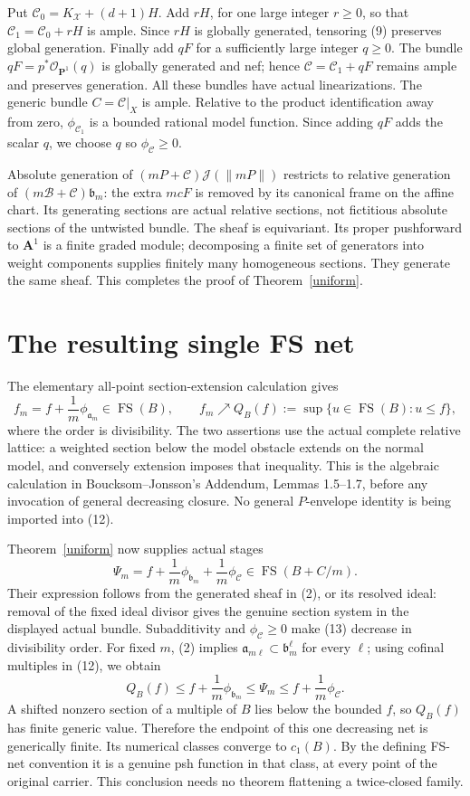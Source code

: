 \documentclass[10pt]{article}
\newcommand{\FS}{\operatorname{FS}}
\newcommand{\J}{\mathcal J}
\newcommand{\OO}{\mathcal O}
\begin{document}
Put $\mathcal C_0=K_{\mathcal X}+(d+1)H$. Add $rH$, for one large
integer $r\geq0$, so that $\mathcal C_1=\mathcal C_0+rH$ is ample.
Since $rH$ is globally generated, tensoring (9) preserves global
generation. Finally add $qF$ for a sufficiently large integer $q\geq0$.
The bundle $qF=p^*\OO_{\mathbf P^1}(q)$ is globally generated and
nef; hence $\mathcal C=\mathcal C_1+qF$ remains ample and preserves
generation. All these bundles have actual linearizations. The generic
bundle $C=\mathcal C|_X$ is ample. Relative to the product identification
away from zero, $\phi_{\mathcal C_1}$ is a bounded rational model
function. Since adding $qF$ adds the scalar $q$, we choose $q$ so
$\phi_{\mathcal C}\geq0$.

Absolute generation of $(mP+\mathcal C)\J(\|mP\|)$ restricts to
relative generation of $(m\mathcal B+\mathcal C)\mathfrak b_m$:
the extra $mcF$ is removed by its canonical frame on the affine chart.
Its generating sections are actual relative sections, not fictitious
absolute sections of the untwisted bundle. The sheaf is equivariant.
Its proper pushforward to $\mathbf A^1$ is a finite graded module;
decomposing a finite set of generators into weight components supplies
finitely many homogeneous sections. They generate the same sheaf.
This completes the proof of Theorem~\ref{uniform}.

\section{The resulting single FS net}
The elementary all-point section-extension calculation gives
\[
 f_m=f+\frac1m\phi_{\mathfrak a_m}\in\FS(B),\qquad
 f_m\nearrow Q_B(f):=\sup\{u\in\FS(B):u\leq f\},        \tag{12}
\]
where the order is divisibility. The two assertions use the actual
complete relative lattice: a weighted section below the model
obstacle extends on the normal model, and conversely extension
imposes that inequality. This is the algebraic calculation in
Boucksom--Jonsson's Addendum, Lemmas 1.5--1.7, before any invocation
of general decreasing closure. No general $P$-envelope identity is
being imported into (12).

Theorem~\ref{uniform} now supplies actual stages
\[
 \Psi_m=f+\frac1m\phi_{\mathfrak b_m}
                 +\frac1m\phi_{\mathcal C}
                  \in\FS(B+C/m).                       \tag{13}
\]
Their expression follows from the generated sheaf in (2), or its
resolved ideal: removal of the fixed ideal divisor gives the genuine
section system in the displayed actual bundle. Subadditivity and
$\phi_{\mathcal C}\geq0$ make (13) decrease in divisibility order.
For fixed $m$, (2) implies
$\mathfrak a_{m\ell}\subset\mathfrak b_m^\ell$ for every $\ell$;
using cofinal multiples in (12), we obtain
\[
 Q_B(f)\leq f+\frac1m\phi_{\mathfrak b_m}
           \leq\Psi_m\leq f+\frac1m\phi_{\mathcal C}.    \tag{14}
\]
A shifted nonzero section of a multiple of $B$ lies below the bounded
$f$, so $Q_B(f)$ has finite generic value. Therefore the endpoint of
this one decreasing net is generically finite. Its numerical classes
converge to $c_1(B)$. By the defining FS-net convention it is a genuine
psh function in that class, at every point of the original carrier.
This conclusion needs no theorem flattening a twice-closed family.
\end{document}
